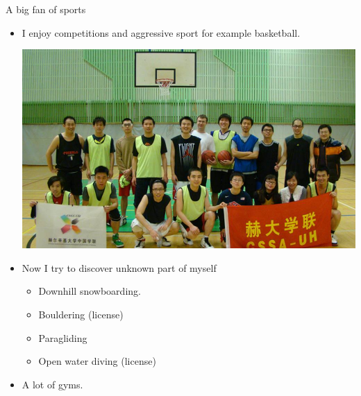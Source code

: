\documentclass[first=dgreen,second=purple,logo=yellowexc]{aaltoslides}
\begin{document}
\begin{frame}{A big fan of sports}
	\begin{itemize}
		\item I enjoy competitions and aggressive sport for example basketball.
		\begin{center}
			\includegraphics[scale=0.15]{./plots/basketball.jpg}
		\end{center}
		\item Now I try to discover unknown part of myself
		\begin{itemize}\footnotesize
			\item Downhill snowboarding.
			\item Bouldering (license)
			\item Paragliding 
			\item Open water diving (license)
		\end{itemize}
		\item A lot of gyms. 
	\end{itemize}
\end{frame}
\end{document}
